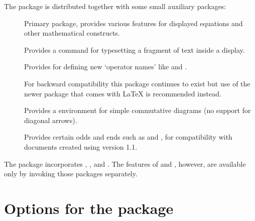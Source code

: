 \documentclass[leqno,titlepage,openany]{amsldoc}[1999/12/13]
\begin{document}
The  package is distributed together with some small
auxiliary packages:
\begin{description}
\item[] Primary package, provides various features for
  displayed equations and other mathematical constructs.

\item[] Provides a  command for
  typesetting a fragment of text inside a display.

\item[] Provides  for defining new
  `operator names' like  and .

\item[] For backward compatibility this package continues
to exist but use of the newer  package that comes with \LaTeX{}
is recommended instead.

\item[] Provides a  environment for simple
  commutative diagrams (no support for diagonal arrows).

\item[] Provides certain odds and ends such as
   and , for compatibility with
  documents created using version 1.1.

\end{description}

The  package incorporates , , and
. The features of  and , however,
are available only by invoking those packages separately.

\chapter{Options for the  package}\label{options}
\end{document}
